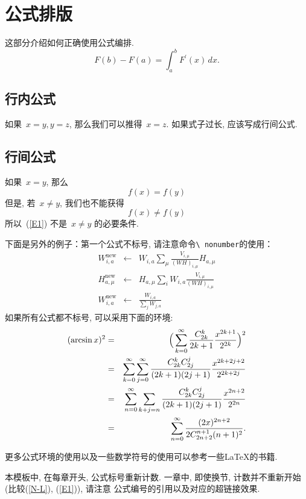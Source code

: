 \documentclass[notitlepage,cs4size,punct,oneside]{ctexrep}
\numberwithin{equation}{chapter}
\theoremstyle{mystyle}
\begin{document}
\chapter{公式排版}
这部分介绍如何正确使用公式编排.
\begin{equation}\label{N-L}
F(b)-F(a)=\int^b_a F^\prime(x)\, dx.
\end{equation}


\section{行内公式}
如果~$x=y,y=z$, 那么我们可以推得~$x=z$. 如果式子过长,
应该写成行间公式.

\section{行间公式}
如果~$x=y$, 那么
$$
f(x) = f(y)
$$
但是, 若~$x\neq y$, 我们也不能获得
\begin{equation}\label{E1}
f(x) \neq f(y)
\end{equation}
所以~(\ref{E1}) 不是~$x\ne y$ 的必要条件.

下面是另外的例子：第一个公式不标号, 请注意命令\texttt{\textbackslash
nonumber}的使用：
\begin{eqnarray}
\nonumber W_{i,a}^{\text{new}} & \leftarrow & W_{i,a} \sum_{\mu} \frac{V_{i,\mu}}{(WH)_{i,\mu}} H_{a,\mu} \\
H_{a,\mu}^{\text{new}} & \leftarrow & H_{a,\mu} \sum_{i} W_{i,a} \frac{V_{i,\mu}}{(WH)_{i,\mu}} \label{eq:renewh}\\
W_{i,a}^{\text{new}} & \leftarrow & \frac{W_{i,a}}{\sum_{j}W_{j,a}}
\end{eqnarray}
如果所有公式都不标号, 可以采用下面的环境:
\begin{eqnarray*}
(\arcsin x)^2 &=& \Big( \sum^\infty_{k=0}{C^k_{2k}\over
2k+1}{x^{2k+1}\over 2^{2k}}\Big)^2\\
&=& \sum^\infty_{k=0}\sum^\infty_{j=0}{C^k_{2k}C^j_{2j}\over
(2k+1)(2j+1)}{x^{2k+2j+2}\over 2^{2k+2j}}\\
& =& \sum^\infty_{n=0}\sum_{k+j=n}{C^k_{2k}C^j_{2j}\over
(2k+1)(2j+1)}{x^{2n+2}\over 2^{2n}}\\
& =& \sum^\infty_{n=0}{(2x)^{2n+2}\over 2C^{n+1}_{2n+2}(n+1)^2}.
\end{eqnarray*}



更多公式环境的使用以及一些数学符号的使用可以参考一些\LaTeX 的书籍.
\par 本模板中, 在每章开头, 公式标号重新计数.
一章中, 即使换节, 计数并不重新开始(比较(\ref{N-L}), (\ref{E1})), 请注意
公式编号的引用以及对应的超链接效果.
\end{document}
